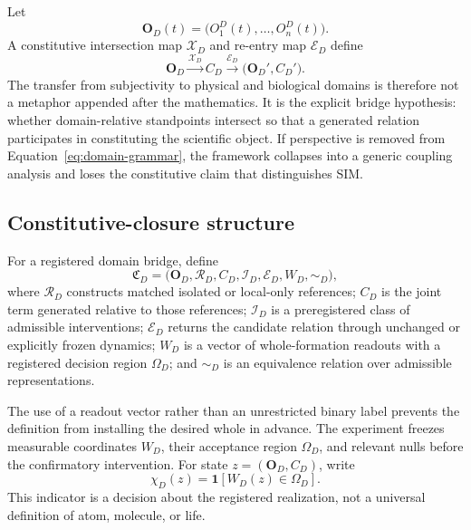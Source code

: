 \documentclass[11pt,a4paper]{article}
\begin{document}
Let
\begin{equation}
 \mathbf O_D(t)=\bigl(O_1^D(t),\ldots,O_n^D(t)\bigr).
\end{equation}
A constitutive intersection map $\mathcal X_D$ and re-entry map $\mathcal E_D$ define
\begin{equation}
 \mathbf O_D
 \xrightarrow{\mathcal X_D}
 C_D
 \xrightarrow{\mathcal E_D}
 \bigl(\mathbf O_D',C_D'\bigr).
 \label{eq:domain-grammar}
\end{equation}
The transfer from subjectivity to physical and biological domains is therefore not a metaphor appended after the mathematics. It is the explicit bridge hypothesis: whether domain-relative standpoints intersect so that a generated relation participates in constituting the scientific object. If perspective is removed from Equation~\eqref{eq:domain-grammar}, the framework collapses into a generic coupling analysis and loses the constitutive claim that distinguishes SIM.

\subsection{Constitutive-closure structure}

For a registered domain bridge, define
\begin{equation}
 \mathfrak C_D=
 \bigl(\mathbf O_D,\mathcal R_D,C_D,\mathcal I_D,
       \mathcal E_D,W_D,\sim_D\bigr),
 \label{eq:closure-structure}
\end{equation}
where $\mathcal R_D$ constructs matched isolated or local-only references; $C_D$ is the joint term generated relative to those references; $\mathcal I_D$ is a preregistered class of admissible interventions; $\mathcal E_D$ returns the candidate relation through unchanged or explicitly frozen dynamics; $W_D$ is a vector of whole-formation readouts with a registered decision region $\Omega_D$; and $\sim_D$ is an equivalence relation over admissible representations.

The use of a readout vector rather than an unrestricted binary label prevents the definition from installing the desired whole in advance. The experiment freezes measurable coordinates $W_D$, their acceptance region $\Omega_D$, and relevant nulls before the confirmatory intervention. For state $z=(\mathbf O_D,C_D)$, write
\begin{equation}
 \chi_D(z)=\mathbf 1\!\left[W_D(z)\in\Omega_D\right].
 \label{eq:whole-criterion}
\end{equation}
This indicator is a decision about the registered realization, not a universal definition of atom, molecule, or life.
\end{document}
